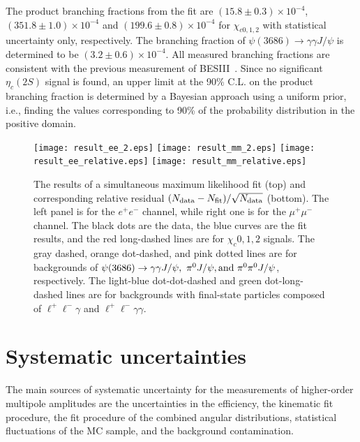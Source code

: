 \documentclass[prd,twocolumn,showpacs,amsmath,amssymb]{revtex4-1}
\begin{document}
The product branching fractions from the fit are $(15.8\pm0.3)\times 10^{-4}$, $(351.8\pm1.0)\times 10^{-4}$ and $(199.6\pm0.8)\times 10^{-4}$ for $\chi_{c0,1,2}$ with statistical uncertainty only, respectively.  The branching fraction of $\psi(3686)\to\gamma\gamma J/\psi$ is determined to be $(3.2\pm0.6)\times 10^{-4}$.  All measured branching fractions are consistent with the previous measurement of BESIII~\cite{BESIII_chicj}.
Since no significant $\eta_{c}(2S)$ signal is found, an upper limit at the 90\% C.L. on the product branching fraction is determined by a Bayesian approach using a uniform prior, i.e., finding the values corresponding to 90\% of the probability distribution in the positive domain.

\begin{figure*}[!htbp]
  \centering
   \texttt{[image: result\_ee\_2.eps]}
   \texttt{[image: result\_mm\_2.eps]}
   \texttt{[image: result\_ee\_relative.eps]}
   \texttt{[image: result\_mm\_relative.eps]}
  \caption{The results of a simultaneous maximum likelihood fit (top) and corresponding relative residual $(N_{\rm data}-N_{\rm fit})/\sqrt{N_{\rm data}}$ (bottom). The left panel is for the $e^+e^-$ channel, while right one is for the $\mu^+\mu^-$ channel. The black dots are the data, the blue curves are the fit results, and the red long-dashed lines are for $\chi_c0,1,2$ signals. The gray dashed, orange dot-dashed, and pink dotted lines are for backgrounds of $\psi(3686)\to\gamma\gamma J/\psi,~ \pi^0 J/\psi, {\rm and} ~ \pi^0\pi^0 J/\psi$, respectively. The light-blue dot-dot-dashed and green dot-long-dashed lines are for backgrounds with final-state particles composed of $\ell^+\ell^-\gamma$ and $\ell^+\ell^-\gamma\gamma$.}
  \label{fit_result} %
\end{figure*}

\section{Systematic uncertainties}\label{sys_error_section}

The main sources of systematic uncertainty for the measurements of higher-order multipole amplitudes are the uncertainties in the efficiency,
the kinematic fit procedure, the fit procedure of the combined angular distributions,
statistical fluctuations of the MC sample, and the background contamination.
\end{document}
